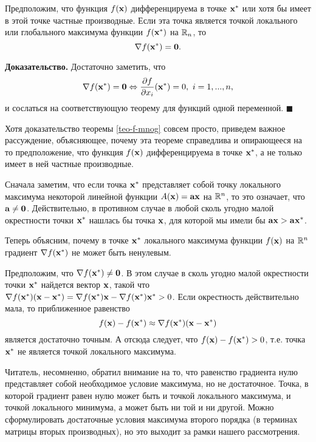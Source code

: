 \begin{teo}
    Предположим, что функция $f(\mathbf{x})$ дифференцируема в точке
    $\mathbf{x^{*}}$ или хотя бы имеет в этой точке частные производные.
    Если эта точка является точкой локального или
    глобального максимума функции $f(\mathbf{x^{*}})$ на $\mathbb{R}_{n}$, то
    \[\nabla f(\mathbf{x^{*}})=\mathbf{0}.\]
\end{teo}
   \label{teo-f-mnog}
    \textbf{Доказательство.} Достаточно заметить, что
    \[\nabla f(\vc{x^{*}})=\vc{0} \Leftrightarrow
    \frac{\partial f}{\partial x_{i}}(\vc{x^{*}})=0, \ i=1,...,n,\]
    и сослаться на соответствующую теорему для функций одной
    переменной. $\blacksquare$


    Хотя доказательство теоремы \ref{teo-f-mnog} совсем просто,
    приведем важное рассуждение, объясняющее, почему эта
    теореме справедлива и опирающееся на то предположение, что
    функция $f(\mathbf{x})$ дифференцируема в точке
    $\mathbf{x^{*}}$, а не только имеет в ней частные производные.


    Сначала заметим, что если точка $\mathbf{x^{*}}$
    представляет собой точку локального максимума некоторой линейной
    функции $A(\mathbf{x})=\mathbf{a}\mathbf{x}$ на $\mathbb{R}^{n}$, то это означает, что
    $\mathbf{a}\neq\mathbf{0}$. Действительно, в
    противном случае в любой сколь угодно малой окрестности точки
    $\mathbf{x^{*}}$ нашлась бы точка $\mathbf{x}$, для которой мы имели бы
    $\mathbf{a}\mathbf{x}>\mathbf{a}\mathbf{x^{*}}$.


    Теперь объясним, почему в точке $\mathbf{x^{*}}$ локального
    максимума функции $f(\mathbf{x})$ на $\mathbb{R}^{n}$ градиент
    $\nabla f(\mathbf{x^{*}})$ не может быть ненулевым.

    Предположим, что
    $\nabla f(\mathbf{x^{*}})\neq\mathbf{0}$. В этом случае в сколь угодно
    малой окрестности точки $\mathbf{x^{*}}$ найдется вектор $\mathbf{x}$,
    такой что
    $\nabla f(\mathbf{x^{*}})(\mathbf{x}-\mathbf{x^{*}})
    =\nabla f(\mathbf{x^{*}})\mathbf{x}-\nabla f(\mathbf{x^{*}})\mathbf{x^{*}}>0$.
    Если  окрестность действительно мала, то  приближенное
    равенство
    \[f(\mathbf{x})-f(\mathbf{x^{*}})\approx\nabla f(\mathbf{x^{*}})(\mathbf{x}-\mathbf{x^{*}})\]
    является достаточно точным. А отсюда следует, что
    $f(\mathbf{x})-f(\mathbf{x^{*}})>0$, т.е. точка
    $\mathbf{x^{*}}$ не является точкой локального максимума.

    Читатель, несомненно, обратил внимание на то, что равенство
    градиента нулю представляет собой необходимое условие максимума,
    но не достаточное. Точка, в которой градиент равен нулю может
    быть и точкой локального максимума, и точкой локального
    минимума, а может быть ни той и ни другой. Можно сформулировать
    достаточные условия максимума второго порядка
    (в терминах матрицы вторых производных), но это выходит за рамки
    нашего рассмотрения.

